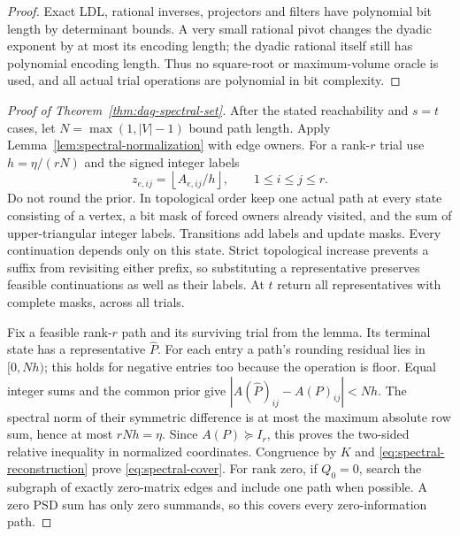 \begin{proof}
Exact LDL, rational inverses, projectors and filters have polynomial bit
length by determinant bounds. A very small rational pivot changes the dyadic
exponent by at most its encoding length; the dyadic rational itself still
has polynomial encoding length. Thus no square-root or maximum-volume oracle
is used, and all actual trial operations are polynomial in bit complexity.
\end{proof}

\begin{proof}[Proof of Theorem~\ref{thm:dag-spectral-set}]
After the stated reachability and $s=t$ cases, let $N=\max(1,|V|-1)$ bound
path length. Apply Lemma~\ref{lem:spectral-normalization} with edge owners.
For a rank-$r$ trial use $h=\eta/(rN)$ and the signed integer labels
\begin{equation}
 z_{e,ij}=\left\lfloor A_{e,ij}/h\right\rfloor,
 \qquad 1\le i\le j\le r.
 \label{eq:signed-profile}
\end{equation}
Do not round the prior. In topological order keep one actual path at every
state consisting of a vertex, a bit mask of forced owners already visited,
and the sum of upper-triangular integer labels. Transitions add labels and
update masks. Every continuation depends only on this state. Strict
topological increase prevents a suffix from revisiting either prefix, so
substituting a representative preserves feasible continuations as well as
their labels. At $t$ return
all representatives with complete masks, across all trials.

Fix a feasible rank-$r$ path and its surviving trial from the lemma. Its
terminal state has a representative $\widehat P$. For each entry a path's
rounding residual lies in $[0,Nh)$; this holds for negative entries too
because the operation is floor. Equal integer sums and the common prior give
$|A(\widehat P)_{ij}-A(P)_{ij}|<Nh$. The spectral norm of their symmetric
difference is at most the maximum absolute row sum, hence at most
$rNh=\eta$. Since $A(P)\succeq I_r$, this proves the two-sided relative
inequality in normalized coordinates. Congruence by $K$ and
\eqref{eq:spectral-reconstruction} prove \eqref{eq:spectral-cover}.
For rank zero, if $Q_0=0$, search the subgraph of exactly zero-matrix edges
and include one path when possible. A zero PSD sum has only zero summands,
so this covers every zero-information path.


\end{proof}
